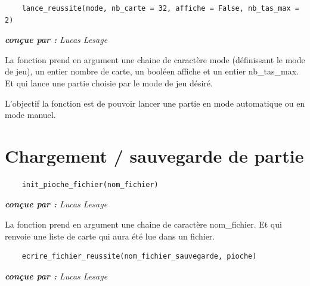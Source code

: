 \documentclass[titlepage]{article}
\begin{document}
\vspace{5mm}

\noindent	\begin{minipage}{\textwidth}
	\begin{lstlisting}
	lance_reussite(mode, nb_carte = 32, affiche = False, nb_tas_max = 2)
	\end{lstlisting}	
	\end{minipage}

\emph{\textbf{conçue par : } Lucas Lesage} \vspace{2mm}\par

La fonction prend en argument une chaine de caractère mode (définissant le mode de jeu), un entier nombre de carte, un booléen affiche et un entier nb\_tas\_max. Et qui lance une partie choisie par le mode de jeu désiré. \vspace{1mm}\par
L’objectif la fonction est de pouvoir lancer une partie en mode automatique ou en mode manuel.\vspace{5mm}

\newpage \section{Chargement / sauvegarde de partie}
\label{sec : charg-sauv}
\noindent	\begin{minipage}{\textwidth}
	\begin{lstlisting}
	init_pioche_fichier(nom_fichier)
	\end{lstlisting}	
	\end{minipage}

\emph{\textbf{conçue par : } Lucas Lesage} \vspace{2mm}\par

La fonction prend en argument une chaine de caractère nom\_fichier. Et qui renvoie une liste de carte qui aura été lue dans un fichier. \vspace{5mm}

\noindent	\begin{minipage}{\textwidth}
	\begin{lstlisting}
	ecrire_fichier_reussite(nom_fichier_sauvegarde, pioche)
	\end{lstlisting}	
	\end{minipage}

\emph{\textbf{conçue par : } Lucas Lesage} \vspace{2mm}\par
\end{document}
